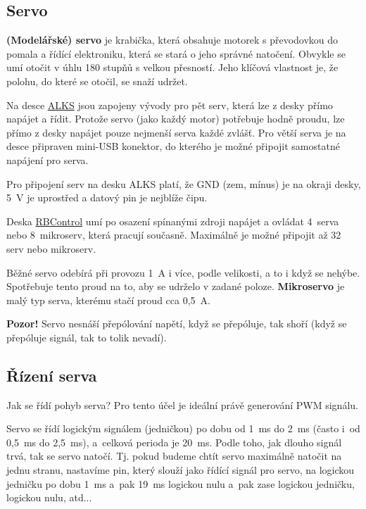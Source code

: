  \subsection{Servo} \label{servo}  

{\bf (Modelářské) servo} je krabička, která obsahuje motorek s převodovkou do pomala a řídící elektroniku, která se stará o jeho správné natočení. Obvykle se umí otočit v úhlu 180 stupňů s velkou přesností. Jeho klíčová vlastnost je, že polohu, do které se otočil, se snaží udržet. 

Na desce \hyperref[alks]{ALKS} jsou zapojeny vývody pro pět serv, která lze z desky přímo napájet a řídit. 
Protože servo (jako každý motor) potřebuje hodně proudu, lze přímo z desky napájet pouze nejmenší serva každé zvlášť. Pro větší serva je na desce připraven mini-USB konektor, do kterého je možné připojit samostatné napájení pro serva. 

Pro připojení serv na desku ALKS platí, že GND (zem, mínus) je na okraji desky, 5~V je uprostřed a datový pin je nejblíže čipu. 

Deska \hyperref[rbcontrol]{RBControl} umí po osazení spínanými zdroji napájet a ovládat 4~serva nebo 8~mikroserv, která pracují současně.
Maximálně je možné připojit až 32 serv nebo mikroserv. 

Běžné servo odebírá při provozu 1~A i více, podle velikosti, a to i když se nehýbe. Spotřebuje tento proud na to, aby se udrželo v zadané poloze. 
\textbf{Mikroservo} je malý typ serva, kterému stačí proud cca 0,5~A.  \label{mikroservo} %

{\bf Pozor!} Servo nesnáší přepólování napětí, když se přepóluje, tak shoří (když se přepóluje signál, tak to tolik nevadí).

\subsection{Řízení serva}

 Jak se řídí pohyb serva? Pro tento účel je ideální právě generování PWM signálu. 

Servo se řídí logickým signálem (jedničkou) po dobu od 1~ms do 2~ms (často i~od 0,5~ms do 2,5~ms), 
a~celková perioda je 20~ms. Podle toho, jak dlouho signál trvá, tak se servo natočí. 
Tj. pokud budeme chtít servo maximálně natočit na jednu stranu, nastavíme pin, který 
slouží jako řídící signál pro servo, na logickou jedničku po dobu 1~ms a~pak 19~ms logickou nulu a~pak zase logickou jedničku, logickou nulu, atd... 

